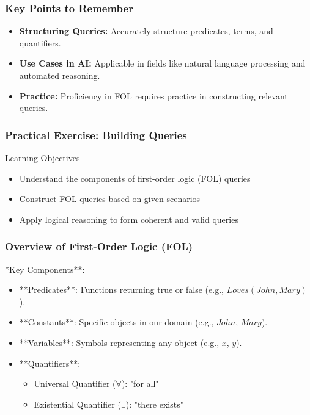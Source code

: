 \documentclass[aspectratio=169]{beamer}
\begin{document}
\begin{frame}[fragile]
    \frametitle{Key Points to Remember}
    \begin{itemize}
        \item \textbf{Structuring Queries:} Accurately structure predicates, terms, and quantifiers.
        \item \textbf{Use Cases in AI:} Applicable in fields like natural language processing and automated reasoning.
        \item \textbf{Practice:} Proficiency in FOL requires practice in constructing relevant queries.
    \end{itemize}
\end{frame}

\begin{frame}[fragile]
    \frametitle{Practical Exercise: Building Queries}
    
    \begin{block}{Learning Objectives}
        \begin{itemize}
            \item Understand the components of first-order logic (FOL) queries
            \item Construct FOL queries based on given scenarios
            \item Apply logical reasoning to form coherent and valid queries
        \end{itemize}
    \end{block}
\end{frame}

\begin{frame}[fragile]
    \frametitle{Overview of First-Order Logic (FOL)}
    
        \item **Key Components**:
        \begin{itemize}
            \item **Predicates**: Functions returning true or false (e.g., $Loves(John, Mary)$).
            \item **Constants**: Specific objects in our domain (e.g., $John$, $Mary$).
            \item **Variables**: Symbols representing any object (e.g., $x$, $y$).
            \item **Quantifiers**:
            \begin{itemize}
                \item Universal Quantifier ($\forall$): "for all"
                \item Existential Quantifier ($\exists$): "there exists"
            \end{itemize}
        \end{itemize}
    \end{frame}
\end{document}
